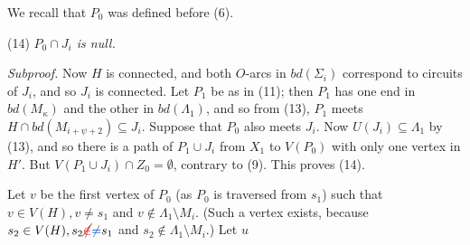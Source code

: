 We recall that $P_0$ was defined before (6).

\hspace*{12pt}(14) \textit{$P_0 \cap J_i$ is null.}

\textit{Subproof.} Now $H$ is connected, and both $O$-arcs in $bd(\Sigma_i)$ correspond to circuits of $J_i$, and so $J_i$ is connected. Let $P_1$ be as in (11); then $P_1$ has one end in $bd(M_\kappa)$ and the other in $bd(\Lambda_1)$, and so from (13), $P_1$ meets $H \cap bd(M_{i+\psi+2}) \subseteq J_i$. Suppose that $P_0$ also meets $J_i$. Now $U(J_i) \subseteq \Lambda_1$ by (13), and so there is a path of $P_1 \cup J_i$ from $X_1$ to $V(P_0)$ with only one vertex in $H'$. But $V(P_1 \cup J_i) \cap Z_0 = \emptyset$, contrary to (9). This proves (14).

Let $v$ be the first vertex of $P_0$ (as $P_0$ is traversed from $s_1$) such that $v \in V(H), v \ne s_1$ and $v \notin \Lambda_1 \setminus M_i$. (Such a vertex exists, because $s_2 \in V(H), s_2 \delm{\notin}\fix{\ne} s_1$ and $s_2 \notin \Lambda_1 \setminus M_i$.) Let $u$

